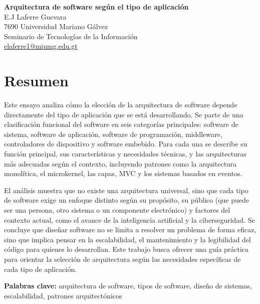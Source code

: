 \documentclass[12pt, letterpaper]{article}
\begin{document}
\RaggedRight%

\begin{center}
  {\bfseries\large Arquitectura de software según el tipo de aplicación
  } \\[0.5em]
  {\normalsize E.J Laferre Guevara} \\
  {\normalsize 7690 Universidad Mariano Gálvez} \\
  {\normalsize Seminario de Tecnologías de la Información} \\
  {\normalsize \href{mailto:elaferre1@miumg.edu.gt}{elaferre1@miumg.edu.gt}}
\end{center}

\section*{Resumen}
Este ensayo analiza cómo la elección de la arquitectura de software depende directamente del tipo de aplicación que se está desarrollando. Se parte de una clasificación funcional del software en seis categorías principales: software de sistema, software de aplicación, software de programación, middleware, controladores de dispositivo y software embebido. Para cada una se describe su función principal, sus características y necesidades técnicas, y las arquitecturas más adecuadas según el contexto, incluyendo patrones como la arquitectura monolítica, el microkernel, las capas, MVC y los sistemas basados en eventos.

El análisis muestra que no existe una arquitectura universal, sino que cada tipo de software exige un enfoque distinto según su propósito, su público (que puede ser una persona, otro sistema o un componente electrónico) y factores del contexto actual, como el avance de la inteligencia artificial y la ciberseguridad. Se concluye que diseñar software no se limita a resolver un problema de forma eficaz, sino que implica pensar en la escalabilidad, el mantenimiento y la legibilidad del código para quienes lo desarrollan. Este trabajo busca ofrecer una guía práctica para orientar la selección de arquitectura según las necesidades específicas de cada tipo de aplicación.

\noindent\textbf{Palabras clave:} arquitectura de software, tipos de software, diseño de sistemas, escalabilidad, patrones arquitectónicos

\end{document}
